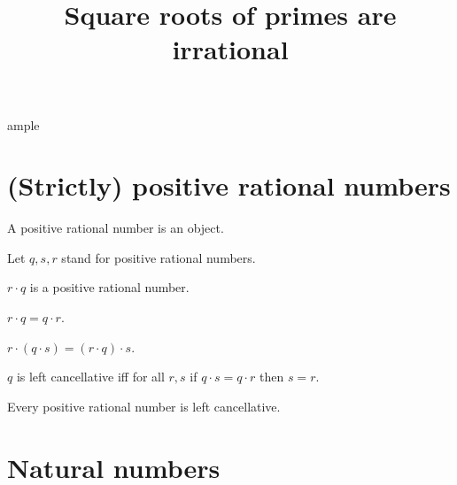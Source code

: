 ample\documentclass[english]{article}
\title{Square roots of primes are irrational}
\author{}
\date{}
\begin{document}
  \maketitle

  \begin{forthel}
  \end{forthel}


  \section*{(Strictly) positive rational numbers}

  \begin{forthel}
    \begin{signature}
      A positive rational number is an object.
    \end{signature}

    Let $q, s, r$ stand for positive rational numbers.

    \begin{signature}
      $r \cdot q$ is a positive rational number.
    \end{signature}

    \begin{axiom}
      $r \cdot q = q \cdot r$.
    \end{axiom}

    \begin{axiom}
      $r \cdot (q \cdot s) = (r \cdot q) \cdot s$.
    \end{axiom}

    \begin{definition}
      $q$ is left cancellative iff
      for all $r, s$ if $q\cdot s = q\cdot r$ then $s = r$.
    \end{definition}

    \begin{axiom}
      Every positive rational number is left cancellative.
    \end{axiom}
  \end{forthel}

  \section*{Natural numbers}
\end{document}
